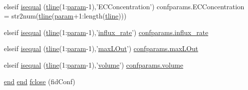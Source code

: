 \begin{DoxyCompactItemize}
$$\item 
elseif \hyperlink{a00022_a020bdc51aec69d386d296cef12a4103f}{isequal} (\hyperlink{a00027_a6791897869706b835f1a5d305739a415}{tline}(1\-:\hyperlink{a00027_a51f20d6b1b54a2eee3be0e8adc96a0ae}{param}-\/1),'E\-C\-Concentration') confparams.\-E\-C\-Concentration = str2num(\hyperlink{a00027_a6791897869706b835f1a5d305739a415}{tline}(\hyperlink{a00027_a51f20d6b1b54a2eee3be0e8adc96a0ae}{param}+1\-:length(\hyperlink{a00027_a6791897869706b835f1a5d305739a415}{tline})))
\item 
elseif \hyperlink{a00022_a70d26090f1be04e2d5574b92311c5e60}{isequal} (\hyperlink{a00027_a6791897869706b835f1a5d305739a415}{tline}(1\-:\hyperlink{a00027_a51f20d6b1b54a2eee3be0e8adc96a0ae}{param}-\/1),'\hyperlink{a00065_ad795c71664f3161dc8f7a769341daadf}{influx\-\_\-rate}') \hyperlink{a00065_ad795c71664f3161dc8f7a769341daadf}{confparams.\-influx\-\_\-rate}
\item 
elseif \hyperlink{a00022_af9bdb7d08f0bf513092ed132ab8fd463}{isequal} (\hyperlink{a00027_a6791897869706b835f1a5d305739a415}{tline}(1\-:\hyperlink{a00027_a51f20d6b1b54a2eee3be0e8adc96a0ae}{param}-\/1),'\hyperlink{a00065_abb126c97fed10420e64f85923bf5e04b}{max\-L\-Out}') \hyperlink{a00065_abb126c97fed10420e64f85923bf5e04b}{confparams.\-max\-L\-Out}
\item 
elseif \hyperlink{a00022_ab95e741dbc04dc8030ed60d7b15454a1}{isequal} (\hyperlink{a00027_a6791897869706b835f1a5d305739a415}{tline}(1\-:\hyperlink{a00027_a51f20d6b1b54a2eee3be0e8adc96a0ae}{param}-\/1),'\hyperlink{a00065_a9bc498ccac8db41438f855f5dd3f4c05}{volume}') \hyperlink{a00065_a9bc498ccac8db41438f855f5dd3f4c05}{confparams.\-volume}
\item 
\hyperlink{a00019_afb358f48b1646c750fb9da6c6585be2b}{end} \hyperlink{a00019_afb358f48b1646c750fb9da6c6585be2b}{end} \hyperlink{a00022_a66a54a4db5a27a03991b5f3034bbc6a4}{fclose} (fid\-Conf)
\end{DoxyCompactItemize}
